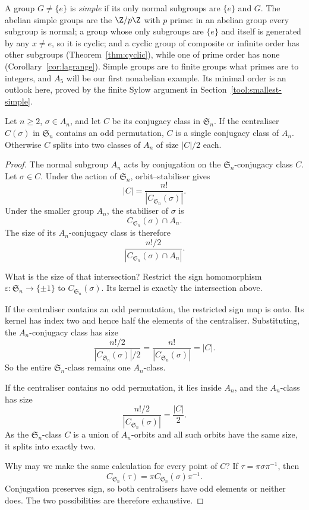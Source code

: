 A group $G\ne\{e\}$ is \emph{simple} if its only normal subgroups are $\{e\}$ and $G$. The abelian simple groups are the $\Z/p\Z$ with $p$ prime: in an abelian group every subgroup is normal; a group whose only subgroups are $\{e\}$ and itself is generated by any $x\ne e$, so it is cyclic; and a cyclic group of composite or infinite order has other subgroups (Theorem~\ref{thm:cyclic}), while one of prime order has none (Corollary~\ref{cor:lagrange}). Simple groups are to finite groups what primes are to integers, and $A_5$ will be our first nonabelian example. Its minimal order is an outlook here, proved by the finite Sylow argument in Section~\ref{tool:smallest-simple}.

\begin{lemma}\label{lem:split}
Let $n\ge2$, $\sigma\in A_n$, and let $C$ be its conjugacy class in $\mathfrak S_n$. If the centraliser $C(\sigma)$ in $\mathfrak S_n$ contains an odd permutation, $C$ is a single conjugacy class of $A_n$. Otherwise $C$ splits into two classes of $A_n$ of size $|C|/2$ each.
\end{lemma}
\begin{proof}
The normal subgroup $A_n$ acts by conjugation
on the $\mathfrak S_n$-conjugacy class $C$.
Let $\sigma\in C$. Under the action of
$\mathfrak S_n$, orbit--stabiliser gives
\[
|C|=\frac{n!}{|C_{\mathfrak S_n}(\sigma)|}.
\]
Under the smaller group $A_n$, the stabiliser
of $\sigma$ is
\[
C_{\mathfrak S_n}(\sigma)\cap A_n.
\]
The size of its $A_n$-conjugacy class is therefore
\[
\frac{n!/2}{|C_{\mathfrak S_n}(\sigma)\cap A_n|}.
\]

What is the size of that intersection?
Restrict the sign homomorphism
$\varepsilon:\mathfrak S_n\to\{\pm1\}$
to $C_{\mathfrak S_n}(\sigma)$.
Its kernel is exactly the intersection above.

If the centraliser contains an odd permutation,
the restricted sign map is onto. Its kernel
has index two and hence half the elements
of the centraliser. Substituting,
the $A_n$-conjugacy class has size
\[
\frac{n!/2}{|C_{\mathfrak S_n}(\sigma)|/2}
=\frac{n!}{|C_{\mathfrak S_n}(\sigma)|}
=|C|.
\]
So the entire $\mathfrak S_n$-class
remains one $A_n$-class.

If the centraliser contains no odd permutation,
it lies inside $A_n$, and the $A_n$-class has size
\[
\frac{n!/2}{|C_{\mathfrak S_n}(\sigma)|}
=\frac{|C|}{2}.
\]
As the $\mathfrak S_n$-class $C$ is a union
of $A_n$-orbits and all such orbits have
the same size, it splits into exactly two.

Why may we make the same calculation for
every point of $C$? If
$\tau=\pi\sigma\pi^{-1}$, then
\[
C_{\mathfrak S_n}(\tau)
=\pi C_{\mathfrak S_n}(\sigma)\pi^{-1}.
\]
Conjugation preserves sign, so both centralisers
have odd elements or neither does.
The two possibilities are therefore exhaustive.
\end{proof}

